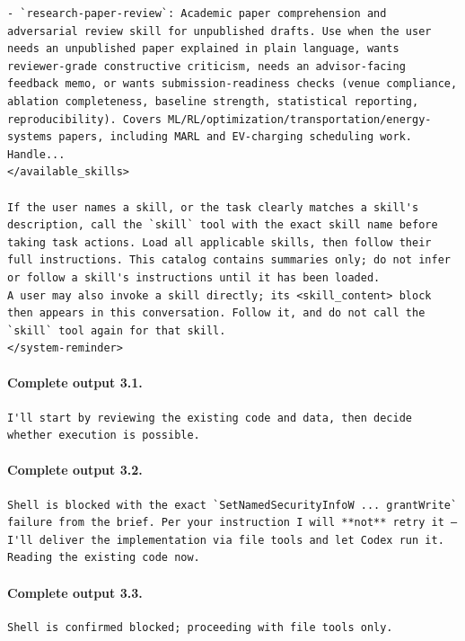 \documentclass[UTF8,10pt]{ctexart}
\begin{document}
\begin{Verbatim}[breaklines=true,breakanywhere=true,fontsize=\scriptsize,frame=single,framesep=2pt]
- `research-paper-review`: Academic paper comprehension and adversarial review skill for unpublished drafts. Use when the user needs an unpublished paper explained in plain language, wants reviewer-grade constructive criticism, needs an advisor-facing feedback memo, or wants submission-readiness checks (venue compliance, ablation completeness, baseline strength, statistical reporting, reproducibility). Covers ML/RL/optimization/transportation/energy-systems papers, including MARL and EV-charging scheduling work. Handle...
</available_skills>

If the user names a skill, or the task clearly matches a skill's description, call the `skill` tool with the exact skill name before taking task actions. Load all applicable skills, then follow their full instructions. This catalog contains summaries only; do not infer or follow a skill's instructions until it has been loaded.
A user may also invoke a skill directly; its <skill_content> block then appears in this conversation. Follow it, and do not call the `skill` tool again for that skill.
</system-reminder>
\end{Verbatim}

\paragraph{Complete output 3.1.}
\begin{Verbatim}[breaklines=true,breakanywhere=true,fontsize=\scriptsize,frame=single,framesep=2pt]
I'll start by reviewing the existing code and data, then decide whether execution is possible.
\end{Verbatim}

\paragraph{Complete output 3.2.}
\begin{Verbatim}[breaklines=true,breakanywhere=true,fontsize=\scriptsize,frame=single,framesep=2pt]
Shell is blocked with the exact `SetNamedSecurityInfoW ... grantWrite` failure from the brief. Per your instruction I will **not** retry it — I'll deliver the implementation via file tools and let Codex run it. Reading the existing code now.
\end{Verbatim}

\paragraph{Complete output 3.3.}
\begin{Verbatim}[breaklines=true,breakanywhere=true,fontsize=\scriptsize,frame=single,framesep=2pt]
Shell is confirmed blocked; proceeding with file tools only.
\end{Verbatim}
\end{document}
